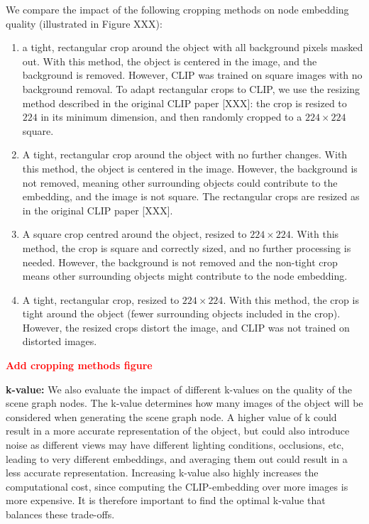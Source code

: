 We compare the impact of the following cropping methods on node embedding quality (illustrated in Figure XXX):
\begin{enumerate}
    \item a tight, rectangular crop around the object with all background pixels masked out. With this method, the object is centered in the image, and the background is removed. However, CLIP was trained on square images with no background removal. To adapt rectangular crops to CLIP, we use the resizing method described in the original CLIP paper [XXX]: the crop is resized to $224$ in its minimum dimension, and then randomly cropped to a $224 \times 224$ square.
    
    \item A tight, rectangular crop around the object with no further changes. With this method, the object is centered in the image. However, the background is not removed, meaning other surrounding objects could contribute to the embedding, and the image is not square. The rectangular crops are resized as in the original CLIP paper [XXX].
    
    \item A square crop centred around the object, resized to $224 \times 224$. With this method, the crop is square and correctly sized, and no further processing is needed. However, the background is not removed and the non-tight crop means other surrounding objects might contribute to the node embedding.
    
    \item A tight, rectangular crop, resized to $224 \times 224$. With this method, the crop is tight around the object (fewer surrounding objects included in the crop). However, the resized crops distort the image, and CLIP was not trained on distorted images.
\end{enumerate}

\textcolor{red}{\textbf{Add cropping methods figure}}

\bigskip \noindent
\textbf{k-value:}
We also evaluate the impact of different k-values on the quality of the scene graph nodes. The k-value determines how many images of the object will be considered when generating the scene graph node. A higher value of k could result in a more accurate representation of the object, but could also introduce noise as different views may have different lighting conditions, occlusions, etc, leading to very different embeddings, and averaging them out could result in a less accurate representation. Increasing k-value also highly increases the computational cost, since computing the CLIP-embedding over more images is more expensive. It is therefore important to find the optimal k-value that balances these trade-offs.

